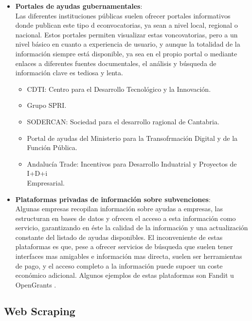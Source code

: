 \begin{itemize}

    \item \textbf{Portales de ayudas gubernamentales}:\\
    Las diferentes instituciones públicas suelen ofrecer portales informativos donde publican este tipo d econvocatorias, ya sean a nivel local, regional o nacional. Estos portales permiten visualizar estas voncovatorias, pero a un nivel básico en cuanto a experiencia de usuario, y aunque la totalidad de la información siempre está disponible, ya sea en el propio portal o mediante enlaces a diferentes fuentes documentales, el análisis y búsqueda de información clave es tediosa y lenta.    
    
    \begin{itemize}
        \item CDTI: Centro para el Desarrollo Tecnológico y la Innovación\cite{cdti}.
        \item Grupo SPRI\cite{spri}.
        \item SODERCAN: Sociedad para el desarrollo ragional de Cantabria\cite{sodercan}.
        \item Portal de ayudas del Ministerio para la Transofrmación Digital y de la Función Pública\cite{ayudasgob}.
        \item Andalucía Trade: Incentivos para Desarrollo Induatrial y Proyectos de I+D+i \\Empresarial\cite{atrade}.
    \end{itemize}

    \item \textbf{Plataformas privadas de información sobre subvenciones}:\\
    Algunas empresas recopilan información sobre ayudas a empresas, las estructuran en bases de datos y ofrecen el acceso a esta información como servicio, garantizando en éste la calidad de la información y una actualización constante del listado de ayudas disponibles.
    El inconveniente de estas plataformas es que, pese a ofrecer servicios de búsqueda que suelen tener interfaces mas amigables e información mas directa, suelen ser herramientas de pago, y el acceso completo a la información puede supoer un coste económico adicional.
    Algunos ejemplos de estas plataformas son Fandit \cite{fandit} u OpenGrants \cite{opengrants}.

\end{itemize}


\subsection{Web Scraping}

